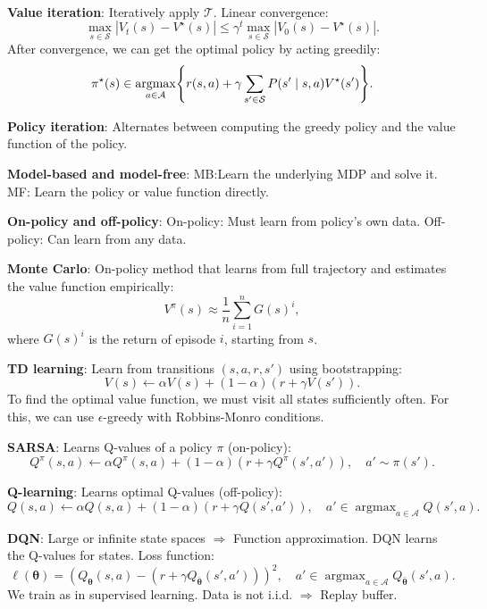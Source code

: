 \documentclass{article}
\DeclareMathOperator*{\argmax}{argmax}
\newcommand{\lft}{\mathopen{}\mathclose\bgroup\left}
\newcommand{\rgt}{\aftergroup\egroup\right}
\renewcommand{\vec}[1]{\bm{#1}}
\newenvironment{topic}[1]
{\textbf{\sffamily \colorbox{black}{\rlap{\textbf{\textcolor{white}{#1}}}\hspace{\linewidth}\hspace{-2\fboxsep}}} \\ \vspace{0.2cm}}
{}
\begin{document}
\begin{multicols*}{2}
\begin{topic}{Reinforcement learning}
        \textbf{Value iteration}: Iteratively apply $\mathcal{T}$. Linear convergence: \[
            \max_{s \in \mathcal{S}} |V_t(s) - V^\star(s)| \leq \gamma^t \max_{s \in \mathcal{S}} |V_0(s) - V^\star(s)|.
        \]
        After convergence, we can get the optimal policy by acting greedily: \[
            \pi^\star(s) \in \argmax_{a \in \mathcal{A}} \lft\{ r(s,a) + \gamma \sum_{s' \in \mathcal{S}} P(s' \mid s, a) V^\star(s') \rgt\}.
        \]

        \textbf{Policy iteration}: Alternates between computing the greedy policy and the value
        function of the policy.

        \textbf{Model-based and model-free}: MB:Learn the underlying MDP and solve it.
        MF: Learn the policy or value function directly.

        \textbf{On-policy and off-policy}: On-policy: Must learn from policy's own data. Off-policy:
        Can learn from any data.

        \textbf{Monte Carlo}: On-policy method that learns from full trajectory and estimates the value function empirically: \[
            V^\pi(s) \approx \frac{1}{n} \sum_{i=1}^{n} G(s)^i,
        \]
        where $G(s)^i$ is the return of episode $i$, starting from $s$.

        \textbf{TD learning}: Learn from transitions $(s, a, r, s')$ using bootstrapping: \[
            V(s) \gets \alpha V(s) + (1- \alpha) (r + \gamma V(s')).
        \]
        To find the optimal value function, we must visit all states sufficiently often. For this, we can
        use $\epsilon$-greedy with Robbins-Monro conditions.

        \textbf{SARSA}: Learns Q-values of a policy $\pi$ (on-policy): \[
            Q^\pi(s,a) \gets \alpha Q^\pi(s,a) + (1-\alpha) (r + \gamma Q^\pi(s', a')), \quad a' \sim \pi(s').
        \]

        \textbf{Q-learning}: Learns optimal Q-values (off-policy): \[
            Q(s,a) \gets \alpha Q(s,a) + (1-\alpha)(r + \gamma Q(s',a')), \quad a' \in \argmax_{a \in \mathcal{A}} Q(s', a).
        \]

        \textbf{DQN}: Large or infinite state spaces $\Rightarrow$ Function approximation. DQN learns
        the Q-values for states. Loss function: \[
            \ell(\vec{\theta}) = (Q_{\vec{\theta}}(s,a) - (r + \gamma Q_{\bar{\vec{\theta}}}(s', a')))^2, \quad a' \in \argmax_{a \in \mathcal{A}} Q_{\bar{\vec{\theta}}}(s', a).
        \]
        We train as in supervised learning. Data is not i.i.d. $\Rightarrow$ Replay buffer.


\end{topic}
\end{multicols*}
\end{document}
